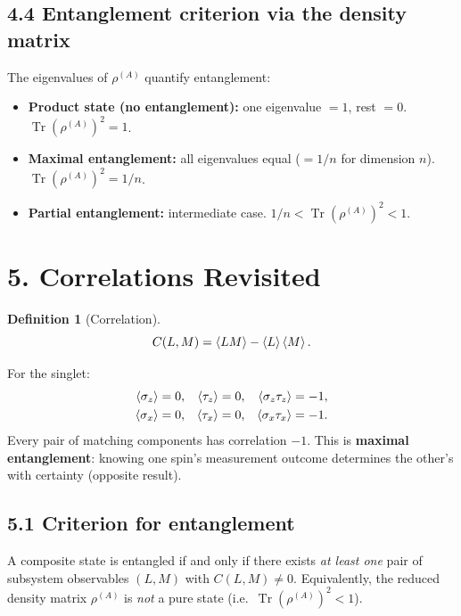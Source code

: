 \documentclass[12pt,a4paper]{article}
\newtheorem{definition}{Definition}
\begin{document}
\subsection{4.4 Entanglement criterion via the density matrix}
The eigenvalues of $\rho^{(A)}$ quantify entanglement:
\begin{itemize}[nosep]
    \item \textbf{Product state (no entanglement):} one eigenvalue $=1$, rest $=0$.  $\operatorname{Tr}(\rho^{(A)})^2 = 1$.
    \item \textbf{Maximal entanglement:} all eigenvalues equal ($=1/n$ for dimension $n$).  $\operatorname{Tr}(\rho^{(A)})^2 = 1/n$.
    \item \textbf{Partial entanglement:} intermediate case.  $1/n < \operatorname{Tr}(\rho^{(A)})^2 < 1$.
\end{itemize}

\section{5. Correlations Revisited}

\begin{definition}[Correlation]
\[
    C(L,M) = \expval{LM} - \expval{L}\expval{M}.
\]
\end{definition}

For the singlet:
\begin{align}
    \expval{\sigma_z} &= 0, & \expval{\tau_z} &= 0, & \expval{\sigma_z\tau_z} &= -1, \\
    \expval{\sigma_x} &= 0, & \expval{\tau_x} &= 0, & \expval{\sigma_x\tau_x} &= -1.
\end{align}
Every pair of matching components has correlation $-1$.  This is \textbf{maximal entanglement}: knowing one spin's measurement outcome determines the other's with certainty (opposite result).

\subsection{5.1 Criterion for entanglement}
A composite state is entangled if and only if there exists \emph{at least one} pair of subsystem observables $(L,M)$ with $C(L,M)\neq 0$.  Equivalently, the reduced density matrix $\rho^{(A)}$ is \emph{not} a pure state (i.e.\ $\operatorname{Tr}(\rho^{(A)})^2 < 1$).

\end{document}
